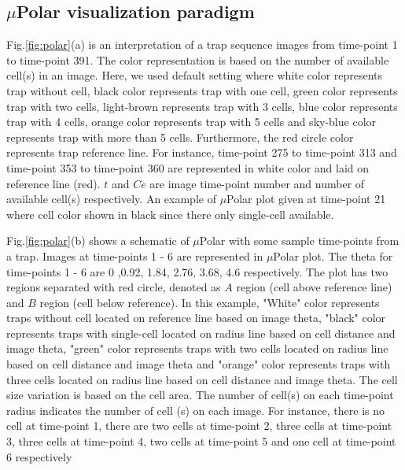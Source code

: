 \documentclass[conference]{IEEEtran}
\begin{document}
\subsection{$\mu$Polar visualization paradigm}

Fig.\ref{fig:polar}(a) is an interpretation of a trap sequence images from time-point 1 to time-point 391. The color representation is based on the number of available cell(s) in an image. Here, we used default setting where white color represents trap without cell, black color represents trap with one cell, green color represents trap with two cells, light-brown represents trap with 3 cells, blue color represents trap with 4 cells, orange color represents trap with 5 cells and sky-blue color represents trap with more than 5 cells. Furthermore, the red circle color represents trap reference line. For instance, time-point 275 to time-point 313 and time-point 353 to time-point 360 are represented in white color and laid on reference line (red). $ t  $ and  $ Ce $  are image time-point number and number of available cell(s) respectively. An example of $\mu$Polar plot given at time-point 21 where cell color shown in black since there only single-cell available. 

Fig.\ref{fig:polar}(b) shows a schematic of $\mu$Polar with some sample time-points from a trap. Images at time-points 1 - 6 are represented in $\mu$Polar plot. The theta for time-points 1 - 6 are 0 ,0.92, 1.84, 2.76, 3.68, 4.6 respectively. The plot has two regions separated with red circle, denoted as $ A $ region (cell above reference line) and $ B $ region (cell below reference). In this example, "White" color represents traps without cell located on reference line based on image theta, "black" color represents traps with single-cell located on radius line based on cell distance and image theta, "green" color represents traps with two cells located on radius line based on cell distance and image theta and "orange" color represents traps with three cells located on radius line based on cell distance and image theta. The cell size variation is based on the cell area. The number of cell(s) on each time-point radius indicates the number of cell (s) on each image. For instance, there is no cell at time-point 1, there are two cells at time-point 2, three cells at time-point 3, three cells at time-point 4, two cells at time-point 5 and one cell at time-point 6 respectively
\end{document}
